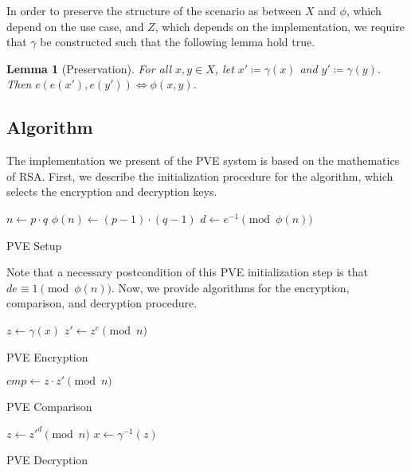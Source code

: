 \documentclass{article}
\newtheorem{lemma}[theorem]{Lemma}
\begin{document}
\begin{multicols}{2}
In order to preserve the structure of the scenario as between $X$ and $\phi$, which depend on the use case, and $Z$, which depends on the implementation, we require that $\gamma$ be constructed such that the following lemma hold true.

\begin{lemma}[Preservation]
    For all $x,y\in X$, let $x' \coloneqq \gamma(x)$ and $y' \coloneqq \gamma(y)$. Then $c(e(x'), e(y')) \iff \phi(x,y)$.
\end{lemma}

\subsection{Algorithm}

The implementation we present of the PVE system is based on the mathematics of RSA. First, we describe the initialization procedure for the algorithm, which selects the encryption and decryption keys.


\begin{algorithm}[H]
\SetAlgoLined
{}
    $n \leftarrow p \cdot q$\;
    $\phi(n) \leftarrow (p - 1) \cdot (q - 1)$\;
    $d \leftarrow e^{-1} \pmod{\phi(n)}$\;
 \caption{PVE Setup}
\end{algorithm}

Note that a necessary postcondition of this PVE initialization step is that $de \equiv 1 \pmod{\phi(n)}$. Now, we provide algorithms for the encryption, comparison, and decryption procedure.

\begin{algorithm}[H]
\SetAlgoLined
{}
    $z \leftarrow \gamma(x)$\;
    $z' \leftarrow z^e \pmod{n}$\;
 \caption{PVE Encryption}
\end{algorithm}

\begin{algorithm}[H]
\SetAlgoLined
{}
    $cmp \leftarrow z \cdot z' \pmod{n}$\;
 \caption{PVE Comparison}
\end{algorithm}

\begin{algorithm}[H]
\SetAlgoLined
{}
    $z \leftarrow z'^d \pmod{n}$\;
    $x \leftarrow \gamma^{-1}(z)$\;
 \caption{PVE Decryption}
\end{algorithm}


\end{multicols}
\end{document}
